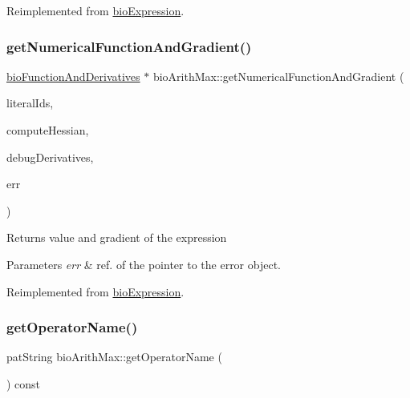 Reimplemented from \hyperlink{classbio_expression_a3e4b4dca58dbbc6f0e411b30eb3f60b4}{bio\+Expression}.

\mbox{\label{classbio_arith_max_add45318e2ced79172265d99e15214b6c}} 
\subsubsection{\texorpdfstring{get\+Numerical\+Function\+And\+Gradient()}{getNumericalFunctionAndGradient()}}
{\footnotesize\ttfamily \hyperlink{classbio_function_and_derivatives}{bio\+Function\+And\+Derivatives} $\ast$ bio\+Arith\+Max\+::get\+Numerical\+Function\+And\+Gradient (\begin{DoxyParamCaption}\item[{vector$<$ pat\+U\+Long $>$}]{literal\+Ids,  }\item[{pat\+Boolean}]{compute\+Hessian,  }\item[{pat\+Boolean}]{debug\+Derivatives,  }\item[{pat\+Error $\ast$\&}]{err }\end{DoxyParamCaption})\hspace{0.3cm}{\ttfamily [virtual]}}

\begin{DoxyReturn}{Returns}
value and gradient of the expression 
\end{DoxyReturn}

\begin{DoxyParams}{Parameters}
{\em err} & ref. of the pointer to the error object. \\
\hline
\end{DoxyParams}


Reimplemented from \hyperlink{classbio_expression_a91c81ce80c9e972c913b10f5f3c1ed13}{bio\+Expression}.

\mbox{\label{classbio_arith_max_a0d4f43812301caafd039e446bbd22bb7}} 
\subsubsection{\texorpdfstring{get\+Operator\+Name()}{getOperatorName()}}
{\footnotesize\ttfamily pat\+String bio\+Arith\+Max\+::get\+Operator\+Name (\begin{DoxyParamCaption}{ }\end{DoxyParamCaption}) const\hspace{0.3cm}{\ttfamily [virtual]}}

